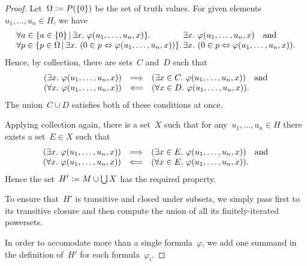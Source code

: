 \documentclass[oneside,reqno]{amsart}
\theoremstyle{definition}
\theoremstyle{plain}
\theoremstyle{remark}
\newcommand{\defeq}{\vcentcolon=}
\renewcommand{\_}{\mathpunct{.}\,}
\newcommand{\?}{\,{:}\,}
\begin{document}
\begin{proof}Let~$\Omega \defeq P(\{0\})$ be the set of truth values.
For given elements~$u_1,\ldots,u_n \in H$, we have
\[ \begin{array}{@{}l@{}l@{}}
  \forall a \in \{ a \in \{0\} \,|\, \exists x\_ \varphi(u_1,\ldots,u_n,x) \}\_ &
  \exists x\_ \varphi(u_1,\ldots,u_n,x) \quad\text{and} \\
  \forall p \in \{ p \in \Omega \,|\, \exists x\_ (0 \in p \Leftrightarrow
  \varphi(u_1,\ldots,u_n,x)) \}\_ &
  \exists x\_ (0 \in p \Leftrightarrow \varphi(u_1,\ldots,u_n,x)).
\end{array} \]
Hence, by collection, there are sets~$C$ and~$D$ such that
\[ \begin{array}{@{}rcl@{}}
  (\exists x\_ \varphi(u_1,\ldots,u_n,x)) &\Longrightarrow&
  (\exists x \in C\_ \varphi(u_1,\ldots,u_n,x)) \quad\text{and} \\
  (\forall x\_ \varphi(u_1,\ldots,u_n,x)) &\Longleftarrow&
  (\forall x \in D\_ \varphi(u_1,\ldots,u_n,x)).
\end{array} \]
The union~$C \cup D$ satisfies both of these conditions at once.

Applying collection again, there is a set~$X$ such that for
any~$u_1,\ldots,u_n \in H$ there exists a set~$E \in X$ such that
\[ \begin{array}{@{}rcl@{}}
  (\exists x\_ \varphi(u_1,\ldots,u_n,x)) &\Longrightarrow&
  (\exists x \in E\_ \varphi(u_1,\ldots,u_n,x)) \quad\text{and} \\
  (\forall x\_ \varphi(u_1,\ldots,u_n,x)) &\Longleftarrow&
  (\forall x \in E\_ \varphi(u_1,\ldots,u_n,x)).
\end{array} \]
Hence the set~$H' \defeq M \cup \bigcup X$ has the required property.

To ensure that~$H'$ is transitive and closed under subsets, we simply pass
first to its transitive closure and then compute the union of all its
finitely-iterated powersets.

In order to accomodate more than a single formula~$\varphi$, we add one summand
in the definition of~$H'$ for each formula~$\varphi_i$.
\end{proof}
\end{document}
